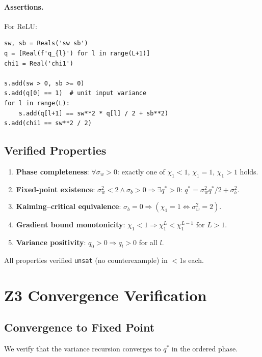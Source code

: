 \documentclass[10pt]{article}
\begin{document}
\paragraph{Assertions.}
For ReLU:
\begin{verbatim}
sw, sb = Reals('sw sb')
q = [Real(f'q_{l}') for l in range(L+1)]
chi1 = Real('chi1')

s.add(sw > 0, sb >= 0)
s.add(q[0] == 1)  # unit input variance
for l in range(L):
    s.add(q[l+1] == sw**2 * q[l] / 2 + sb**2)
s.add(chi1 == sw**2 / 2)
\end{verbatim}

\subsection{Verified Properties}

\begin{enumerate}[nosep]
    \item \textbf{Phase completeness}: $\forall \sigma_w > 0$: exactly one of $\chi_1 < 1$, $\chi_1 = 1$, $\chi_1 > 1$ holds.
    \item \textbf{Fixed-point existence}: $\sigma_w^2 < 2 \land \sigma_b > 0 \Rightarrow \exists q^* > 0$: $q^* = \sigma_w^2 q^*/2 + \sigma_b^2$.
    \item \textbf{Kaiming--critical equivalence}: $\sigma_b = 0 \Rightarrow (\chi_1 = 1 \Leftrightarrow \sigma_w^2 = 2)$.
    \item \textbf{Gradient bound monotonicity}: $\chi_1 < 1 \Rightarrow \chi_1^L < \chi_1^{L-1}$ for $L > 1$.
    \item \textbf{Variance positivity}: $q_0 > 0 \Rightarrow q_l > 0$ for all $l$.
\end{enumerate}

All properties verified \texttt{unsat} (no counterexample) in $<$1s each.

\section{Z3 Convergence Verification}
\label{app:z3-convergence}

\subsection{Convergence to Fixed Point}

We verify that the variance recursion converges to $q^*$ in the ordered phase.
\end{document}
